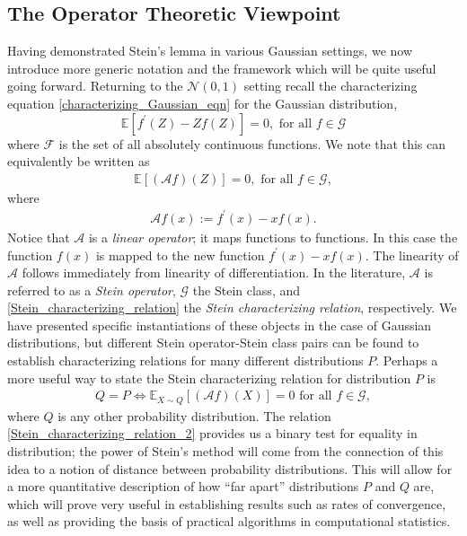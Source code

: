 \documentclass[12pt]{article}
\newcommand{\E}{\mathbb{E}}
\newcommand{\Gaussian}{\mathcal{N}}
\newcommand{\functionSpace}{\mathcal{F}} %
\newcommand{\steinClass}{\mathcal{G}}
\newcommand{\steinOperator}{\mathcal{A}}
\newcommand{\dist}{P}
\newcommand{\distApprox}{Q}
\begin{document}
\subsection{The Operator Theoretic Viewpoint}
Having demonstrated Stein's lemma in various Gaussian settings, we now introduce more generic notation and the framework which will be quite useful going forward. Returning to 
the $\Gaussian(0, 1)$ setting recall the characterizing equation \ref{characterizing_Gaussian_eqn} for the Gaussian distribution, 
\[
\E\left[f^\prime(Z) - Z f(Z) \right] = 0, \text{ for all } f \in \steinClass
\]
where $\functionSpace$ is the set of all absolutely continuous functions. We note that this can equivalently be written as 
\begin{align}
\E\left[(\steinOperator f)(Z) \right] = 0, \text{ for all } f \in \steinClass, \label{Stein_characterizing_relation}
\end{align}
where 
\begin{align}
\steinOperator f(x) := f^\prime(x) - xf(x).
\end{align}
Notice that $\steinOperator$ is a \textit{linear operator}; it maps functions to functions. In this case the function $f(x)$ is mapped to the new function 
$f^\prime(x) - xf(x)$. The linearity of $\steinOperator$ follows immediately from linearity of differentiation. In the literature, $\steinOperator$ is referred to as 
a \textit{Stein operator}, $\steinClass$ the Stein class, and \ref{Stein_characterizing_relation} the \textit{Stein characterizing relation}, respectively. We have 
presented specific instantiations of these objects in the case of Gaussian distributions, but different Stein operator-Stein class pairs can be found to establish 
characterizing relations for many different distributions $\dist$. Perhaps a more useful way to state the Stein characterizing relation for distribution $\dist$
 is
 \begin{align}
 \distApprox = \dist \iff \E_{X \sim \distApprox} \left[(\steinOperator f)(X) \right] = 0 \text{ for all } f \in \steinClass, \label{Stein_characterizing_relation_2}
 \end{align}
 where $\distApprox$ is any other probability distribution. The relation \ref{Stein_characterizing_relation_2} provides us a binary test for equality in distribution; 
 the power of Stein's method will come from the connection of this idea to a notion of distance between probability distributions. This will allow for a more 
 quantitative description of how ``far apart'' distributions $\dist$ and $\distApprox$ are, which will prove very useful in establishing results such as rates of convergence, 
 as well as providing the basis of practical algorithms in computational statistics. 
\end{document}
